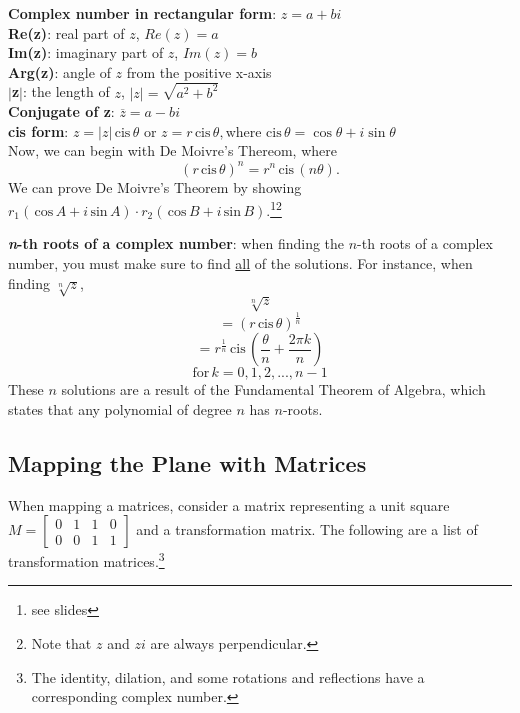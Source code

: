 \documentclass[12pt, letterpaper]{article}
\begin{document}
\textbf{Complex number in rectangular form}: \(z=a+bi\)\\
\textbf{Re(z)}: real part of \(z\), \(Re(z)=a\)\\
\textbf{Im(z)}: imaginary part of \(z\), \(Im(z)=b\)\\
\textbf{Arg(z)}: angle of \(z\) from the positive x-axis\\
\(|\)\textbf{z}\(|\): the length of \(z\), \(|z|=\sqrt{a^2+b^2}\)\\
\textbf{Conjugate of z}: \(\overline{z}=a-bi\)\\
\textbf{cis form}: \(z = |z| \, \text{cis} \, \theta \text{ or } z = r \, \text{cis} \, \theta, \text{where cis} \, \theta = \cos \theta + i \sin \theta\)
\vspace{1em}\\

Now, we can begin with De Moivre's Thereom, where \[(r \, \text{cis} \, \theta)^n = r^n \, \text{cis} \, (n\theta) \text{.}\] 
We can prove De Moivre's Theorem by showing \(r_1( \, \text{cos} \, A+i \, \text{sin} \, A)\cdot r_2( \, \text{cos} \, B+i \, \text{sin} \, B)\).\footnote{see slides}\footnote{Note that \(z\) and \(zi\) are always perpendicular.}
\vspace{1em}\\
\pagebreak

\textbf{\textit{n}-th roots of a complex number}: when finding the \(n\)-th roots of a complex number, you must make sure to find \underline{all} of the solutions. For instance, when finding \(\sqrt[n]{z}\), \[\sqrt[n]{z}\] \[=(r \, \text{cis} \, \theta)^{\frac{1}{n}}\] \[=r^{\frac{1}{n}} \, \text{cis} \, (\frac{\theta}{n}+\frac{2\pi k}{n})\] \[\text{for} \,k = 0,1,2,...,n-1\]
These \(n\) solutions are a result of the Fundamental Theorem of Algebra, which states that any polynomial of degree \(n\) has \(n\)-roots.

\subsection{Mapping the Plane with Matrices}
When mapping a matrices, consider a matrix representing a unit square \(M=
\begin{bmatrix}
0 & 1 & 1 & 0 \\
0 & 0 & 1 & 1
\end{bmatrix}\) and a transformation matrix. The following are a list of transformation matrices.\footnote{The identity, dilation, and some rotations and reflections have a corresponding complex number.} \vspace{1em}\\ 
\end{document}
